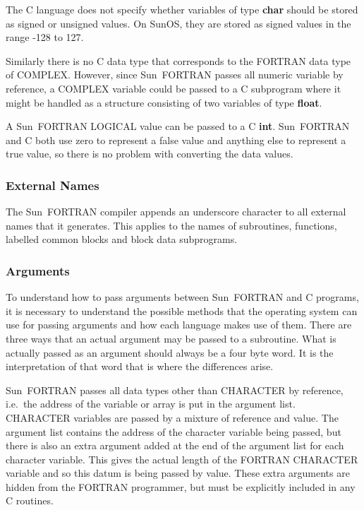 The C language does not specify whether variables of type {\bf char} should be
stored as signed or unsigned values. On SunOS, they are stored as signed
values in the range -128 to 127.

Similarly there is no C data type that corresponds to the FORTRAN data type of
COMPLEX. However, since Sun~FORTRAN passes all numeric variable by reference, a
COMPLEX variable could be passed to a C subprogram where it might be handled as
a structure consisting of two variables of type {\bf float}.

A Sun~FORTRAN LOGICAL value can be passed to a C {\bf int}. Sun~FORTRAN and C both use
zero to represent a false value and anything else to represent a true value, so
there is no problem with converting the data values.

\subsubsection{External Names}

The Sun~FORTRAN compiler appends an underscore character to all external names that 
it generates. This applies to the names of subroutines, functions, labelled
common blocks and block data subprograms.

\subsubsection{Arguments}
\label{sun:arg}

To understand how to pass arguments between Sun~FORTRAN and C programs, it is
necessary to understand the possible methods that the operating system can use
for passing arguments and how each language makes use of them. There are three
ways that an actual argument may be passed to a subroutine. What is actually
passed as an argument should always be a four byte word. It is the
interpretation of that word that is where the differences arise. 

Sun~FORTRAN passes all data types other than CHARACTER by reference, i.e.\ the
address of the variable or array is put in the argument list. CHARACTER
variables are passed by  a mixture of reference and value. The argument list
contains the address of the character variable being passed, but there is also 
an extra argument added at the end of the argument list for each character
variable. This gives the actual length of the FORTRAN CHARACTER variable and so
this datum is being passed by value. These extra arguments are hidden from the
FORTRAN programmer, but must be explicitly included in any C routines.

